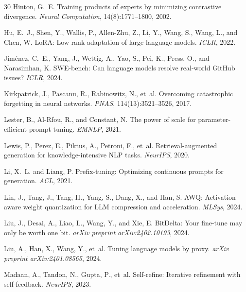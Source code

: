 \documentclass[11pt]{article}
\begin{document}
\begin{thebibliography}{30}
Hinton, G.~E.
\newblock Training products of experts by minimizing contrastive divergence.
\newblock \emph{Neural Computation}, 14(8):1771--1800, 2002.

Hu, E.~J., Shen, Y., Wallis, P., Allen-Zhu, Z., Li, Y., Wang, S., Wang, L.,
  and Chen, W.
\newblock LoRA: Low-rank adaptation of large language models.
\newblock \emph{ICLR}, 2022.

Jim{\'e}nez, C.~E., Yang, J., Wettig, A., Yao, S., Pei, K., Press, O., and
  Narasimhan, K.
\newblock SWE-bench: Can language models resolve real-world {GitHub} issues?
\newblock \emph{ICLR}, 2024.

Kirkpatrick, J., Pascanu, R., Rabinowitz, N., et~al.
\newblock Overcoming catastrophic forgetting in neural networks.
\newblock \emph{PNAS}, 114(13):3521--3526, 2017.

Lester, B., Al-Rfou, R., and Constant, N.
\newblock The power of scale for parameter-efficient prompt tuning.
\newblock \emph{EMNLP}, 2021.

Lewis, P., Perez, E., Piktus, A., Petroni, F., et~al.
\newblock Retrieval-augmented generation for knowledge-intensive NLP tasks.
\newblock \emph{NeurIPS}, 2020.

Li, X.~L. and Liang, P.
\newblock Prefix-tuning: Optimizing continuous prompts for generation.
\newblock \emph{ACL}, 2021.

Lin, J., Tang, J., Tang, H., Yang, S., Dang, X., and Han, S.
\newblock AWQ: Activation-aware weight quantization for LLM compression and
  acceleration.
\newblock \emph{MLSys}, 2024.

Liu, J., Desai, A., Liao, L., Wang, Y., and Xie, E.
\newblock BitDelta: Your fine-tune may only be worth one bit.
\newblock \emph{arXiv preprint arXiv:2402.10193}, 2024.

Liu, A., Han, X., Wang, Y., et~al.
\newblock Tuning language models by proxy.
\newblock \emph{arXiv preprint arXiv:2401.08565}, 2024.

Madaan, A., Tandon, N., Gupta, P., et~al.
\newblock Self-refine: Iterative refinement with self-feedback.
\newblock \emph{NeurIPS}, 2023.


\end{thebibliography}
\end{document}

